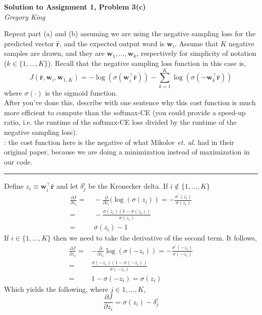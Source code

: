 \documentclass[letter,12pt]{article}
\newcommand{\myhwtitle}[3]
{\begin{center}
{\large {\bf Solution to Assignment {#1}, Problem {#2}}}\\
\medskip 
{\it {#3}} %
\end{center}}
\begin{document}
\myhwtitle{1}{3(c)}{Gregory King}
\bigskip
\noindent Repeat part (a) and (b) assuming we are using the negative sampling loss for the predicted vector $\hat{\boldsymbol r}$, and 
the expected output word is ${\boldsymbol w}_{i}$. Assume that $K$ negative samples are drawn, and they are ${\boldsymbol w}_{1},...,{\boldsymbol w}_{k}$, respectively for simplicity of notation ($k\in\{1,...,K\}$). Recall that the negative sampling loss function in this case is,
\begin{equation}
J(\hat{\boldsymbol r}, {\boldsymbol w}_{i}, {\boldsymbol w}_{1..K}) = -\log(\sigma( {\boldsymbol w}^{\top}_{i}\hat{\boldsymbol r})) - \sum^{K}_{k=1}\log(\sigma(- {\boldsymbol w}^{\top}_{k}\hat{\boldsymbol r}))
\end{equation}
where $\sigma(\cdot)$ is the sigmoid function.\\

\noindent After you've done this, describe with one sentence why this cost function is much more efficient to
compute than the softmax-CE (you could provide a speed-up ratio, i.e. the runtime of the softmax-CE loss divided by the
runtime of the negative sampling loss).\\

: the cost function here is the negative of what Mikolov \textit{et. al.} had in their original paper,
because we are doing a minimization instead of maximization in our code.\vspace{5mm}

\noindent\rule{\textwidth}{0.4pt}\vspace{5mm}
Define $z_{i} \equiv {\boldsymbol w}^{\top}_{i}\hat{\boldsymbol r}$ and let $\delta^{i}_{j}$ be the Kronecker delta. If $i \notin \{1,...,K\}$
\begin{align}
\frac{\partial J}{\partial{z_{i}}} =& ~-\frac{\partial}{\partial{z_{i}}}(\log(\sigma(z_{i})) = -\frac{\sigma^{\prime}(z_{i})}{\sigma(z_{i})} \\
                                               =& ~-\frac{\sigma(z_{i})(1 - \sigma(z_{i}))}{\sigma(z_{i})} \\
                                               =& ~\sigma(z_{i}) - 1
\end{align}
If $i \in \{1,...,K\}$ then we need to take the derivative of the second term. It follows,
\begin{align}
\frac{\partial J}{\partial{z_{i}}} =& -\frac{\partial}{\partial{z_{i}}}\log(\sigma(-z_{i})) = -\frac{\sigma^{\prime}(-z_{i})}{\sigma(-z_{i})}\\
                                              =&  \frac{\sigma(-z_{i})(1 - \sigma(-z_{i}))}{\sigma(-z_{i})} \\
                                              =& 1 - \sigma(-z_{i}) = \sigma(z_{i})
\end{align}
Which yields the following, where $j\in{1,...,K}$,
\begin{equation*}
\frac{\partial{J}}{\partial{z_{i}}} = \sigma(z_{i}) - \delta^{i}_{j}
\end{equation*}
\end{document}
